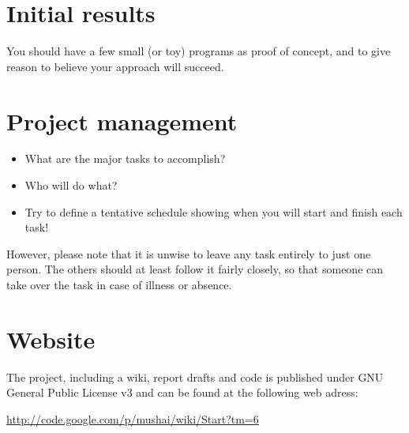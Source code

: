 \documentclass[times, 10pt,twocolumn]{article}
\begin{document}
\section{Initial results}
You should have a few small (or toy) programs as proof of concept, and to give reason to believe your approach will succeed.

\section{Project management}
\begin{itemize}
	\item{What are the major tasks to accomplish?}
	\item{Who will do what?}
	\item{Try to define a tentative schedule showing when you will start and finish each task!}
\end{itemize}
However, please note that it is unwise to leave any task entirely to just one person. The others should at least follow it fairly closely, so that someone can take over the task in case of illness or absence.

\section{Website}
The project, including a wiki, report drafts and code is published under GNU General Public License v3 and can be found at the following web adress:

\url{http://code.google.com/p/mushai/wiki/Start?tm=6}

\nocite{games_solved,course_book}


\end{document}
